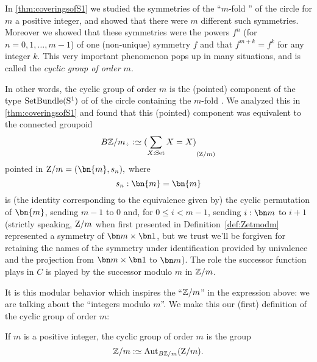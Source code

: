 \begin{example}\label{ex:cyclicgroups}
In \cref{thm:coveringsofS1} we studied the symmetries of the ``$m$-fold \covering''
of the circle for $m$ a positive integer, and showed that there were $m$ different
such symmetries. Moreover we showed that these symmetries were the powers $f^n$ (for $n=0,1,\dots,m-1$)
of one (non-unique) symmetry $f$ and that $f^{m+k}=f^k$ for any integer $k$.
This very important phenomenon pops up in many situations,
and is called the \emph{cyclic group of order $m$}.


In other words, the cyclic group of order $m$ is the (pointed) component of the type $\mathrm{SetBundle}({\mathrm{S}^1})$ of \coverings of the circle containing the $m$-fold \covering.
We analyzed this in \cref{thm:coveringsofS1} and found that this (pointed) component was equivalent to the connected groupoid
$$B\ZZ/m_\div\defequi\conncomp{(\sum_{X:\Set}X=X)}{\zet/m}$$
pointed in $\zet/m = (\bn{m},s_n),$
where
$$s_n :\bn{m}=\bn{m}$$ is (the identity corresponding to the equivalence given by)
the cyclic permutation of $\bn{m}$, sending $m-1$ to $0$ and,
for $0\leq i<m-1$, sending $i:\bn m$ to $i+1$ (strictly speaking, $\mathrm{Z}/m$ when first presented in Definition~\ref{def:Zetmodm} represented a symmetry of $\bn m\times\bn 1$, but we trust we'll be forgiven for retaining the names of the symmetry under identification provided by univalence and the projection from $\bn m\times \bn1$ to $\bn m$). The role
the successor function plays in $C$ is played by the successor modulo $m$ in $\mathbb{Z}/m$.

It is this modular behavior which inspires the ``$\mathbb{Z}/m$'' in the expression above: we are talking about the ``integers modulo $m$''.
We make this our (first) definition of the cyclic group of order $m$:
\end{example}
\begin{definition}\label{def:Z/mgroup}
  If $m$ is a positive integer, the cyclic group of order $m$ is the group
  $$\ZZ/m\defequi\aut_{B\ZZ/m}(\zet/m).$$
\end{definition}


